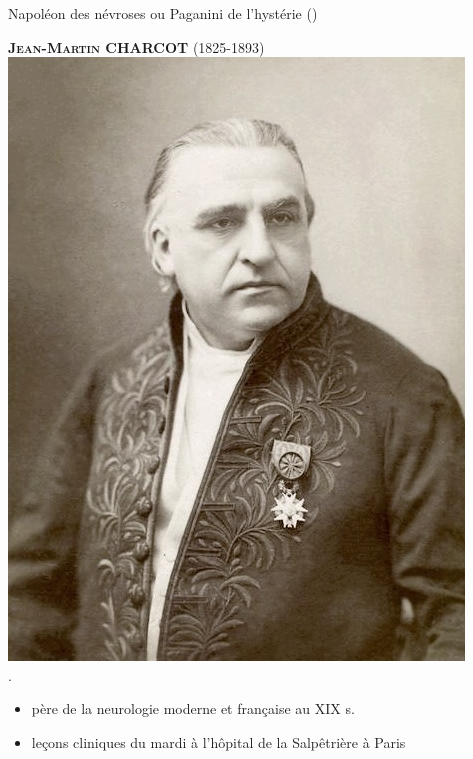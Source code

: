 \begin{frame}{\og{}Napoléon des névroses\fg{} ou \og{}Paganini de l'hystérie\fg{} {\small(\hypersetup{citecolor=yellow}\cite{marmion2015freud})}}

\textsc{\textcolor{deepblue}{\textbf{Jean-Martin CHARCOT}} (1825-1893)}
\hbox{\hspace{10.3em} \includegraphics[scale=0.06]{pic/Jean-Martin_Charcot.jpg}}\\\hbox{.}
\begin{itemize}
\item père de la neurologie moderne et française au XIX\ieme{} s. 
\item leçons cliniques du mardi à l'hôpital de la Salpêtrière à Paris \\

\end{itemize}
\end{frame}
